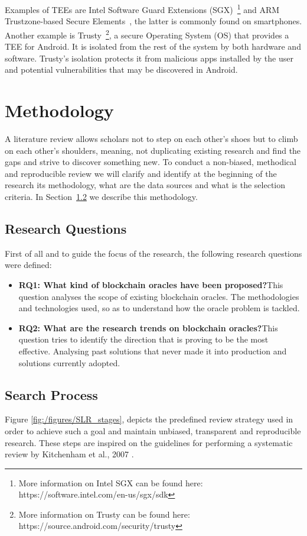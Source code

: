 \documentclass[final,3p,12pt,twocolumn]{elsarticle}
\begin{document}
Examples of TEEs are Intel Software Guard Extensions (SGX)~\footnote{More information on Intel SGX can be found here: https://software.intel.com/en-us/sgx/sdk} and ARM Trustzone-based Secure Elements~\citet{Bunz2018}, the latter is commonly found on smartphones. Another example is Trusty~\footnote{More information on Trusty can be found here: https://source.android.com/security/trusty}, a secure Operating System (OS) that provides a TEE for Android. It is isolated from the rest of the system by both hardware and software. Trusty's isolation protects it from malicious apps installed by the user and potential vulnerabilities that may be discovered in Android.


\section{Methodology}\label{sec:3}
A literature review allows scholars not to step on each other's shoes but to climb on each other's shoulders, meaning, not duplicating existing research and find the gaps and strive to discover something new. To conduct a non-biased, methodical and reproducible review we will clarify and identify at the beginning of the research its methodology, what are the data sources and what is the selection criteria. In Section~\ref{search-process} we describe this methodology.

\subsection{Research Questions}
First of all and to guide the focus of the research, the following research questions were defined:
\begin{itemize}
  \item \textbf{RQ1:\label{RQ1} What kind of blockchain oracles have been proposed?}\newline This question analyses the scope of existing blockchain oracles. The methodologies and technologies used, so as to understand how the oracle problem is tackled.
  \item \textbf{RQ2:\label{RQ2} What are the research trends on blockchain oracles?}\newline This question tries to identify the direction that is proving to be the most effective. Analysing past solutions that never made it into production and solutions currently adopted.
\end{itemize}

\subsection{Search Process}\label{search-process}
Figure \ref{fig:/figures/SLR_stages}, depicts the predefined review strategy used in order to achieve such a goal and maintain unbiased, transparent and reproducible research. These steps are inspired on the guidelines for performing a systematic review by Kitchenham et al., 2007 \cite{Kitchenham2007}.
\end{document}
